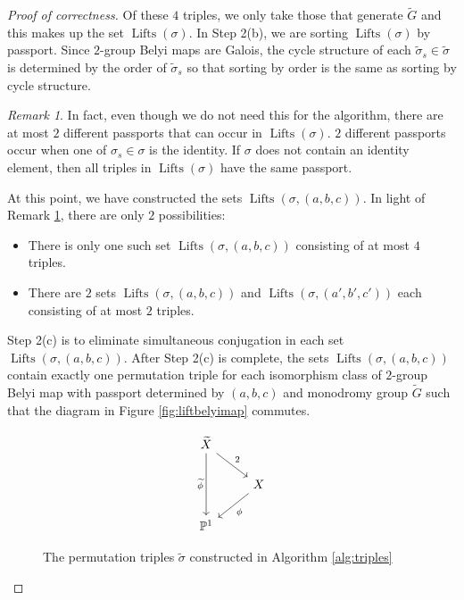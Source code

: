 \documentclass{dcthesis}
\newcommand{\PP}{\mathbb P}
\newcommand{\wt}[1]{\widetilde{#1}}
\DeclareMathOperator{\Lifts}{Lifts}
\theoremstyle{definition}
\theoremstyle{remark}
\newtheorem{remark}[prop]{Remark}
\numberwithin{equation}{section}
\numberwithin{figure}{section}
\begin{document}
{{\begin{proof}[Proof of correctness]
      Of these $4$ triples, we only take those that generate $\wt{G}$
      and this makes up the set $\Lifts(\sigma)$.
      In Step 2(b),
      we are sorting $\Lifts(\sigma)$ by passport.
      Since $2$-group Belyi maps are Galois,
      the cycle structure of each $\wt{\sigma}_s\in\wt{\sigma}$
      is determined by the order of $\wt{\sigma}_s$
      so that sorting by order is the same as sorting by cycle structure.
      \begin{remark}\label{rmk:twouniquepassports}
        In fact,
        even though we do not need this for the algorithm,
        there are at most $2$ different passports that can occur
        in $\Lifts(\sigma)$.
        $2$ different passports occur when one of $\sigma_s\in\sigma$
        is the identity.
        If $\sigma$ does not contain an identity element,
        then all triples in $\Lifts(\sigma)$ have the same passport.
      \end{remark}
      At this point,
      we have constructed the sets $\Lifts(\sigma,(a,b,c))$.
      In light of Remark \ref{rmk:twouniquepassports},
      there are only $2$ possibilities:
      \begin{itemize}
        \item
          There is only one such set $\Lifts(\sigma, (a,b,c))$
          consisting of at most $4$ triples.
        \item
          There are $2$ sets $\Lifts(\sigma, (a,b,c))$ and $\Lifts(\sigma, (a',b',c'))$
          each consisting of at most $2$ triples.
      \end{itemize}
      Step 2(c) is to eliminate simultaneous conjugation in each
      set $\Lifts(\sigma, (a,b,c))$.
      After Step 2(c) is complete,
      the sets $\Lifts(\sigma, (a,b,c))$ contain exactly one permutation triple
      for each isomorphism class of $2$-group Belyi map with passport determined by
      $(a,b,c)$ and monodromy group $\wt{G}$ such that the diagram in
      Figure \ref{fig:liftbelyimap} commutes.
      \begin{figure}[ht]
        \[
          \begin{tikzcd}[ampersand replacement=\&]
            \widetilde{X}\arrow{dd}[swap]{\widetilde{\phi}}\arrow{dr}{2}\\
            \&X\arrow{dl}{\phi}\\
            \PP^1
          \end{tikzcd}
        \]
        \caption{
          The permutation triples $\wt{\sigma}$ constructed in
          Algorithm \ref{alg:triples}
}
\end{figure}
\end{proof}}}
\end{document}

